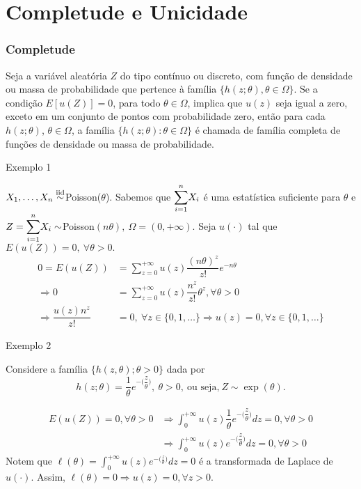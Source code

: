 \documentclass[12pt]{beamer}
\begin{document}
\section{Completude e Unicidade}
\begin{frame}{}
\frametitle{Completude}
\begin{definicao}
\justifying
Seja a variável aleatória $Z$ do tipo contínuo ou discreto, com função de densidade ou massa de probabilidade que pertence à família $\{h(z; \theta), \theta \in \Omega\}$. Se a condição $E[u(Z)] = 0$, para todo $\theta \in \Omega$, implica que $u(z)$ seja igual a zero, exceto em um conjunto de pontos com probabilidade zero, então para cada $h(z; \theta)$, $\theta \in \Omega$, a família $\{h(z; \theta) : \theta \in \Omega\}$ é chamada de família completa de funções de densidade ou massa de probabilidade.
\end{definicao}
\end{frame}

\begin{frame}{Exemplo 1}
\begin{block}{}
\justifying
$X_{1},\ldots,X_{n}\overset{\text{iid}}{\sim}$Poisson($\theta$). Sabemos que ${\displaystyle \sum_{i=1}^{n}} X_{i}$ é uma estatística suficiente para $\theta$ e $Z={\displaystyle \sum_{i=1}^{n}} X_{i}\sim$Poisson$(n\theta),~\Omega=(0,+\infty).$ Seja $u(\cdot)$ tal que $E(u(Z))=0,~\forall\theta>0.$
\begin{align*}
0=E(u(Z))&={\displaystyle \sum_{z=0}^{+\infty}u(z)\dfrac{(n\theta)^{z}}{z!}e^{-n\theta}}\\
\Rightarrow 0&={\displaystyle \sum_{z=0}^{+\infty}u(z)\dfrac{n^{z}}{z!}\theta^{z}}, \forall \theta>0\\
\Rightarrow \dfrac{u(z)n^{z}}{z!}&=0,~\forall z\in\{0,1,\ldots\} \Rightarrow u(z)=0,\forall z\in\{0,1,\ldots\}
\end{align*}

\end{block}
\end{frame}

\begin{frame}{Exemplo 2}
\begin{block}{}
\justifying
Considere a família $\{h(z,\theta); \theta>0\}$ dada por $$h(z;\theta)=\dfrac{1}{\theta}e^{-\big(\dfrac{z}{\theta}\big)},~\theta>0,~\text{ou seja,}~Z\sim\exp{(\theta)}.$$
\end{block}
\pause
\begin{block}{}
\justifying
\begin{align*}
    E(u(Z))=0,\forall \theta>0&\Rightarrow \int_{0}^{+\infty}u(z)\dfrac{1}{\theta}e^{-\Big(\dfrac{z}{\theta}\Big)}dz=0,\forall \theta>0\\
    &\Rightarrow \int_{0}^{+\infty}u(z)e^{-\Big(\dfrac{z}{\theta}\Big)}dz=0,\forall \theta>0
\end{align*}
Notem que $\ell(\theta)=\int_{0}^{+\infty}u(z)e^{-\Big(\frac{z}{\theta}\Big)}dz=0$ é a transformada de Laplace de $u(\cdot).$ Assim, $\ell(\theta)=0\Rightarrow u(z)=0,\forall z>0.$
\end{block}
\end{frame}
\end{document}
